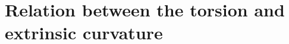\documentclass[
10pt, %
a4paper, %
oneside, %
headinclude,footinclude, %
BCOR5mm, %
]{scrartcl}
\newcommand{\IP}[1]{{\color{Red}[IP:\ \ #1]}}
\newcommand{\sA}{\mathsmaller A}
\newcommand{\sB}{\mathsmaller B}
\newcommand{\pd}[1]{\partial_{#1}}
\newcommand{\MG}[1]{\kappa^{#1}}			%
\newcommand{\itetrsymbol}{\eta}
\newcommand{\itetr}[2]{\itetrsymbol^{#1}_{\phantom{#1}#2}}
\newcommand{\Dfin}[2]{\mathtt{D}_{\phantom{#2}#1}^{#2}}	%
\newcommand{\Hfin}[2]{\mathtt{H}_{#2#1}}	%
\newcommand{\Efin}[2]{\mathtt{E}^{#1}_{\phantom{#1}#2}}	%
\newcommand{\Hfinn}[2]{\hat{\mathtt{H}}_{{#2}{#1}}}	%
\newcommand{\Efinn}[2]{\hat{\mathtt{E}}^{#1}_{\ #2}}	%
\newcommand{\Bfin}[2]{\mathtt{B}^{#1#2}}	%
\newcommand{\LCsymb}{\bm{\in}}    %
\newcommand{\indalg}[1]{\hat{\mathsmaller{#1}}}
\newcommand{\shift}[1]{\beta^{#1}}
\begin{document}
%
%
%
%




\section{Relation between the torsion and extrinsic curvature}
\end{document}
